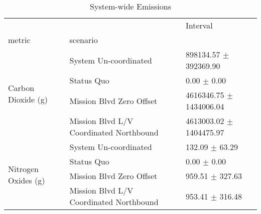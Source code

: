 \begin{table}
\caption{System-wide Emissions}
\begin{tabular}{lll}
\toprule
 &  & Interval \\
metric & scenario &  \\
\midrule
\multirow[t]{4}{*}{Carbon Dioxide (g)} & System Un-coordinated & 898134.57 $\pm$ 392369.90 \\
 & Status Quo & 0.00 $\pm$ 0.00 \\
 & Mission Blvd Zero Offset & 4616346.75 $\pm$ 1434006.04 \\
 & Mission Blvd L/V Coordinated Northbound & 4613003.02 $\pm$ 1404475.97 \\
\multirow[t]{4}{*}{Nitrogen Oxides (g)} & System Un-coordinated & 132.09 $\pm$ 63.29 \\
 & Status Quo & 0.00 $\pm$ 0.00 \\
 & Mission Blvd Zero Offset & 959.51 $\pm$ 327.63 \\
 & Mission Blvd L/V Coordinated Northbound & 953.41 $\pm$ 316.48 \\
\bottomrule
\end{tabular}
\end{table}
